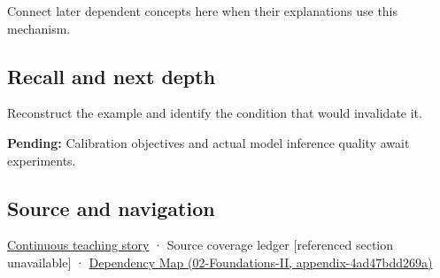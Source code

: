 Connect later dependent concepts here when their explanations use this mechanism.

\subsection{Recall and next depth}\label{appendix-d5da3eaabaef-recall-and-next-depth}

Reconstruct the example and identify the condition that would invalidate it.

\textbf{Pending:} Calibration objectives and actual model inference quality await experiments.

\subsection{Source and navigation}\label{appendix-d5da3eaabaef-source-and-navigation}

\hyperref[01-foundations-i-ch001-choosing-what-information-to-keep]{Continuous teaching story} · {Source coverage ledger {[}referenced section unavailable{]}} · \href{../02-Foundations-II/main.pdf\#nameddest=appendix-4ad47bdd269a}{Dependency Map (02-Foundations-II, appendix-4ad47bdd269a)}
